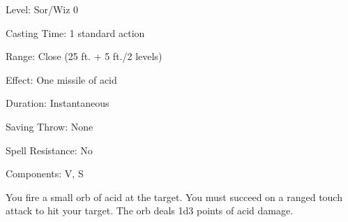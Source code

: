 
\begin{description*}
\item[Level:] Sor/Wiz 0
\item[Casting Time:] 1 standard action
\item[Range:] Close (25 ft. + 5 ft./2 levels)
\item[Effect:] One missile of acid
\item[Duration:] Instantaneous
\item[Saving Throw:] None
\item[Spell Resistance:] No
\item[Components:] V, S
\end{description*}

You fire a small orb of acid at the target. You must succeed on a ranged touch
attack to hit your target. The orb deals 1d3 points of acid damage.